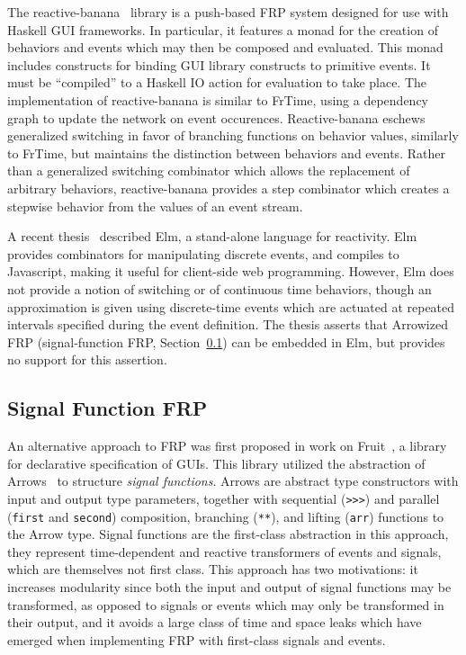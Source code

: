 The reactive-banana~\cite{Apfelmus} library is a push-based FRP system designed for use with Haskell GUI frameworks. In particular, it features a monad for
the creation of behaviors and events which may then be composed and evaluated. This monad includes constructs for binding GUI library constructs to primitive events.
It must be ``compiled'' to a Haskell IO action for evaluation to take place. The implementation of reactive-banana is similar to FrTime, using a dependency graph to 
update the network on event occurences. Reactive-banana eschews generalized switching in favor of branching functions on behavior values, similarly to FrTime, but
maintains the distinction between behaviors and events. Rather than a generalized switching combinator which allows the replacement of arbitrary behaviors,
reactive-banana provides a step combinator which creates a stepwise behavior from the values of an event stream.

A recent thesis~\cite{Czaplicki2012} described Elm, a stand-alone language for reactivity. Elm provides combinators for manipulating discrete events, and
compiles to Javascript, making it useful for client-side web programming. However, Elm does not provide a notion of switching or of continuous time behaviors,
though an approximation is given using discrete-time events which are actuated at repeated intervals specified during the event definition. The thesis asserts
that Arrowized FRP (signal-function FRP, Section~\ref{subsection:signal_function_frp}) can be embedded in Elm, but provides no support for this assertion.

\subsection{Signal Function FRP}
\label{subsection:signal_function_frp}

An alternative approach to FRP was first proposed in work on Fruit~\cite{Courtney2001-1}, a library for declarative specification of GUIs. This library
utilized the abstraction of Arrows~\cite{Hughes2000} to structure {\em signal functions}. Arrows are abstract type constructors with input and output type
parameters, together with sequential ({\tt >>>}) and parallel ({\tt first} and {\tt second}) composition, branching ({\tt ***}), and lifting ({\tt arr}) functions
to the Arrow type. Signal functions are the first-class abstraction in this approach, they represent time-dependent and reactive transformers of events and signals, 
which are themselves not first class. This approach has two motivations: it increases modularity since both the input and output of signal functions may be transformed,
as opposed to signals or events which may only be transformed in their output, and it avoids a large class of time and space leaks which have emerged when
implementing FRP with first-class signals and events.

